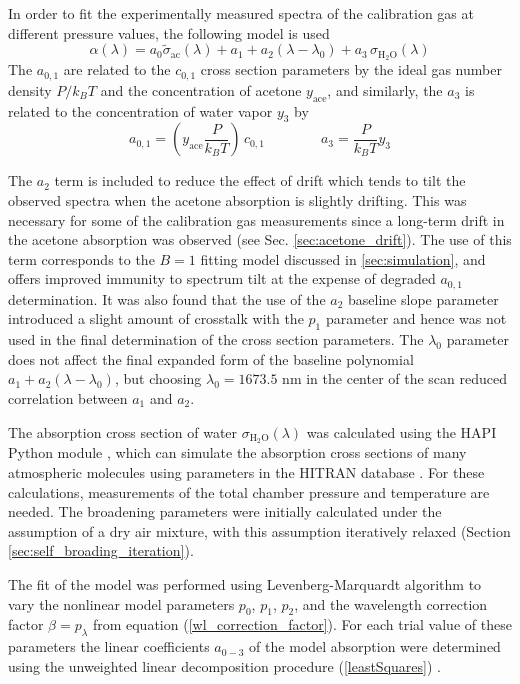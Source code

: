 \documentclass[12pt]{report}
\begin{document}
	In order to fit the experimentally measured spectra of the calibration gas at different pressure values, the following model is used
	\begin{equation} \label{fit_model}
		\alpha(\lambda) = a_0\tilde{\sigma}_{\mathrm{ac}}(\lambda) + a_1 + a_2(\lambda - \lambda_0) + a_3\,\sigma_\mathrm{H_2O}(\lambda)
	\end{equation}
	The $a_{0,1}$ are related to the $c_{0,1}$ cross section parameters by the ideal gas number density $P/k_B T$ and the concentration of acetone $y_\mathrm{ace}$, and similarly, the $a_3$ is related to the concentration of water vapor $y_3$ by
	\begin{equation} \label{ai}
		a_{0,1} = \left(y_\mathrm{ace}\frac{P}{k_B T}\right)\,c_{0,1} \qquad\qquad
		a_{3} = \frac{P}{k_B T} y_{3}
	\end{equation}
	
	The $a_2$ term is included to reduce the effect of drift which tends to tilt the observed spectra when the acetone absorption is slightly drifting. This was necessary for some of the calibration gas measurements since a long-term drift in the acetone absorption was observed (see Sec. \ref{sec:acetone_drift}). The use of this term corresponds to the $B=1$ fitting model discussed in \ref{sec:simulation}, and offers improved immunity to spectrum tilt at the expense of degraded $a_{0,1}$ determination. It was also found that the use of the $a_2$ baseline slope parameter introduced a slight amount of crosstalk with the $p_1$ parameter and hence was not used in the final determination of the cross section parameters. The $\lambda_0$ parameter does not affect the final expanded form of the baseline polynomial $a_1 + a_2(\lambda-\lambda_0)$, but choosing $\lambda_0 =1673.5$ nm in the center of the scan reduced correlation between $a_{1}$ and $a_2$.
	
	The absorption cross section of water $\sigma_\mathrm{H_2O}(\lambda)$ was calculated using the HAPI Python module \cite{HAPI_2016}, which can simulate the absorption cross sections of many atmospheric molecules using parameters in the HITRAN database \cite{hitran_2020}. For these calculations, measurements of the total chamber pressure and temperature are needed. The broadening parameters were initially calculated under the assumption of a dry air mixture, with this assumption iteratively relaxed (Section \ref{sec:self_broading_iteration}).
	
	The fit of the model was performed using Levenberg-Marquardt algorithm to vary the nonlinear model parameters $p_0$, $p_1$, $p_2$, and the wavelength correction factor $\beta = p_\lambda$ from equation (\ref{wl_correction_factor}). For each trial value of these parameters the linear coefficients $a_{0-3}$ of the model absorption were determined using the unweighted linear decomposition procedure (\ref{leastSquares}) .
	
\end{document}
